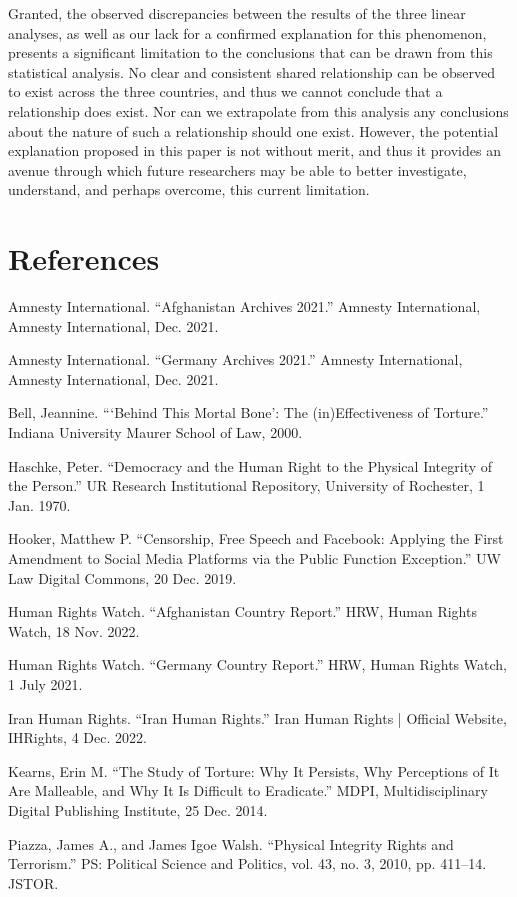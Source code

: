 \documentclass{article}
\begin{document}
Granted, the observed discrepancies between the results of the three linear analyses, as well as our lack for a confirmed explanation for this phenomenon, presents a significant limitation to the conclusions that can be drawn from this statistical analysis. No clear and consistent shared relationship can be observed to exist across the three countries, and thus we cannot conclude that a relationship does exist. Nor can we extrapolate from this analysis any conclusions about the nature of such a relationship should one exist. However, the potential explanation proposed in this paper is not without merit, and thus it provides an avenue through which future researchers may be able to better investigate, understand, and perhaps overcome, this current limitation.

\section{References}
Amnesty International. “Afghanistan Archives 2021.” Amnesty International, Amnesty International, Dec. 2021. 

Amnesty International. “Germany Archives 2021.” Amnesty International, Amnesty International, Dec. 2021.

Bell, Jeannine. “‘Behind This Mortal Bone’: The (in)Effectiveness of Torture.” Indiana University Maurer School of Law, 2000.

Haschke, Peter. “Democracy and the Human Right to the Physical Integrity of the Person.” UR Research Institutional Repository, University of Rochester, 1 Jan. 1970.

Hooker, Matthew P. “Censorship, Free Speech and Facebook: Applying the First Amendment to Social Media Platforms via the Public Function Exception.” UW Law Digital Commons, 20 Dec. 2019.

Human Rights Watch. “Afghanistan Country Report.” HRW, Human Rights Watch, 18 Nov. 2022.

Human Rights Watch. “Germany Country Report.” HRW, Human Rights Watch, 1 July 2021.

Iran Human Rights. “Iran Human Rights.” Iran Human Rights | Official Website, IHRights, 4 Dec. 2022. 

Kearns, Erin M. “The Study of Torture: Why It Persists, Why Perceptions of It Are Malleable, and Why It Is Difficult to Eradicate.” MDPI, Multidisciplinary Digital Publishing Institute, 25 Dec. 2014.

Piazza, James A., and James Igoe Walsh. “Physical Integrity Rights and Terrorism.” PS: Political Science and Politics, vol. 43, no. 3, 2010, pp. 411–14. JSTOR.
\end{document}

